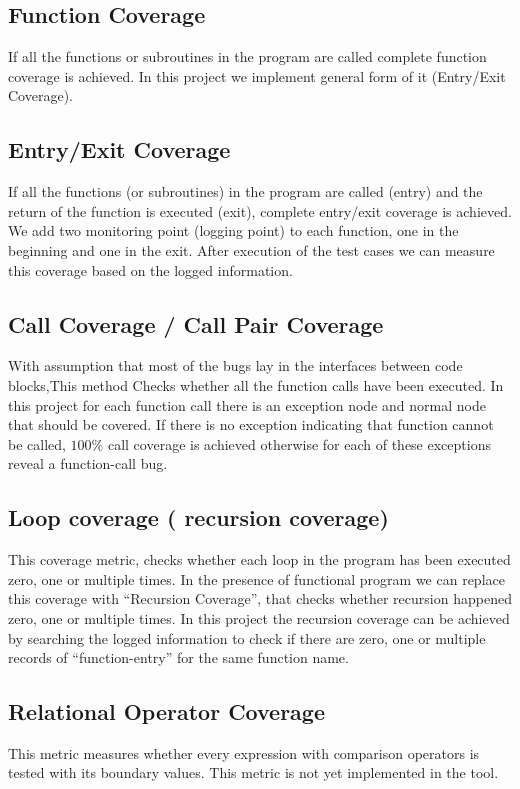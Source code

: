 \documentclass[12pt,a4paper]{report}
\begin{document}
\subsection{Function Coverage}
If all the functions or subroutines in the program are called complete function coverage is achieved.
In this project we implement general form of it (Entry/Exit Coverage).

\subsection{Entry/Exit Coverage}
If all the functions (or subroutines) in the program are called (entry) and the return of the function is executed (exit),  complete entry/exit
 coverage is achieved.
We add two monitoring point (logging point) to each function, one in the beginning and one in the exit. After execution of the test cases we can
 measure this coverage based on the logged information. 

\subsection{Call Coverage / Call Pair Coverage}
With assumption that most of the bugs lay in the interfaces between code blocks,This method Checks whether all the function calls have been executed.
In this project for each function call there is an exception node and normal node that should be covered. If there is no exception indicating that function 
cannot be called, $100\%$ call coverage is achieved otherwise for each of these exceptions reveal a function-call bug.

\subsection{Loop coverage ( recursion coverage)}
This coverage metric, checks whether each loop in the program has been executed zero, one or multiple times. In the presence of functional program we can
 replace this coverage with ``Recursion Coverage'', that checks whether recursion happened zero, one or multiple times. In this project the recursion
 coverage can be achieved by searching the logged information to check if there are zero, one or multiple records of “function-entry” for the same function
 name. %

\subsection{Relational Operator Coverage}
This metric measures whether every expression with comparison operators is tested with its boundary values.
This metric is not yet implemented in the tool.
\end{document}
